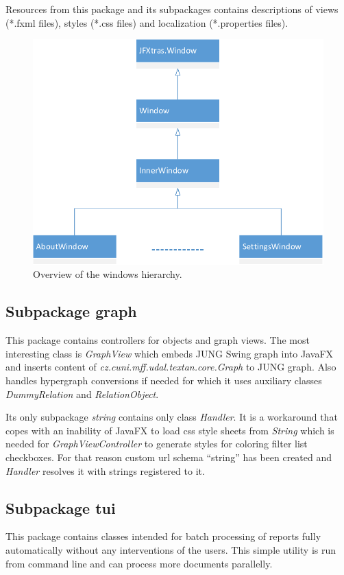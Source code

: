 Resources from this package and its subpackages contains descriptions of views
(*.fxml files), styles (*.css files) and localization (*.properties files).

\begin{figure}[!htb]
        \centering
        \includegraphics[width=\textwidth]{Images/Windows}
        \caption{Overview of the windows hierarchy.}
        \label{fig:Windows}
\end{figure}

\subsection{Subpackage graph}

This package contains controllers for objects and graph views. The most
interesting class is \emph{GraphView} which embeds JUNG Swing graph into JavaFX
and inserts content of \emph{cz.cuni.mff.udal.textan.core.Graph} to JUNG graph.
Also handles hypergraph conversions if needed for which it uses auxiliary
classes \emph{DummyRelation} and \emph{RelationObject}.

Its only subpackage \emph{string} contains only class \emph{Handler}. It is a
workaround that copes with an inability of JavaFX to load css style sheets from
\emph{String} which is needed for \emph{GraphViewController} to generate styles
for coloring filter list checkboxes. For that reason custom url schema ``string''
has been created and \emph{Handler} resolves it with strings registered to it.

\subsection{Subpackage tui}

This package contains classes intended for batch processing of reports fully
automatically without any interventions of the users. This simple utility is run
from command line and can process more documents parallelly.
